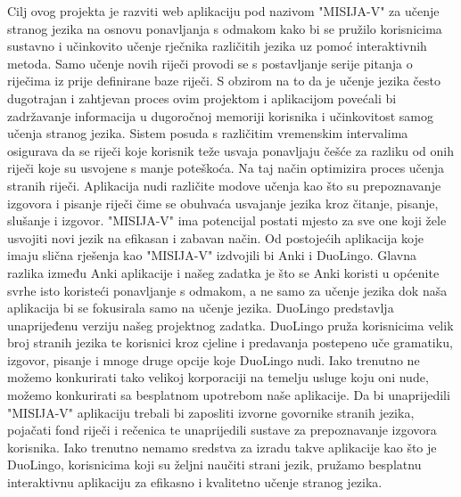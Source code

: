 		 Cilj ovog projekta je razviti web aplikaciju pod nazivom "MISIJA-V" za učenje stranog jezika na osnovu ponavljanja s odmakom kako bi se pružilo korisnicima sustavno i učinkovito učenje rječnika različitih jezika uz pomoć interaktivnih metoda. Samo učenje novih riječi provodi se s postavljanje serije pitanja o riječima iz prije definirane baze riječi. S obzirom na to da je učenje jezika često dugotrajan i zahtjevan proces ovim projektom i aplikacijom povećali bi zadržavanje informacija u dugoročnoj memoriji korisnika i učinkovitost samog učenja stranog jezika. Sistem posuda s različitim vremenskim intervalima osigurava da se riječi koje korisnik teže usvaja ponavljaju češće za razliku od onih riječi koje su usvojene s manje poteškoća. Na taj način  optimizira proces učenja stranih riječi. Aplikacija nudi različite modove učenja kao što su prepoznavanje izgovora i pisanje riječi čime se obuhvaća usvajanje jezika kroz čitanje, pisanje, slušanje i izgovor. "MISIJA-V" ima potencijal postati mjesto za sve one koji žele usvojiti novi jezik na efikasan i zabavan način.
		Od postojećih aplikacija koje imaju slična rješenja kao "MISIJA-V" izdvojili
		bi Anki i DuoLingo. Glavna razlika između Anki aplikacije i našeg zadatka je što se Anki koristi u općenite svrhe isto koristeći ponavljanje s odmakom, a ne samo za učenje jezika dok naša aplikacija bi se fokusirala samo na učenje jezika. DuoLingo predstavlja unaprijeđenu verziju našeg projektnog zadatka. DuoLingo pruža korisnicima velik broj stranih jezika te korisnici kroz cjeline i predavanja postepeno uče gramatiku, izgovor, pisanje i mnoge druge opcije koje DuoLingo nudi. Iako trenutno ne možemo konkurirati tako velikoj korporaciji na temelju usluge koju oni nude, možemo konkurirati sa besplatnom upotrebom naše aplikacije. Da bi unaprijedili "MISIJA-V" aplikaciju trebali bi zaposliti izvorne govornike stranih jezika, pojačati fond riječi i rečenica te unaprijedili sustave za prepoznavanje izgovora korisnika. Iako trenutno nemamo sredstva za izradu takve aplikacije kao što je DuoLingo, korisnicima koji su željni naučiti strani jezik, pružamo besplatnu interaktivnu aplikaciju za efikasno i kvalitetno učenje stranog jezika.
		
		

	